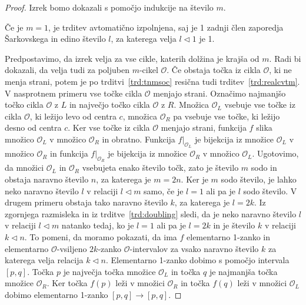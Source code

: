 \documentclass[mat2]{fmfdelo}
\begin{document}
\begin{proof}
Izrek bomo dokazali s pomočjo indukcije na število $m$. 

Če je $m=1$, je trditev avtomatično izpolnjena, saj je 1 zadnji člen zaporedja Šarkovskega in edino število $l$, za katerega velja $l \triangleleft 1$ je 1. 

Predpostavimo, da izrek velja za vse cikle, katerih dolžina je krajša od $m$. Radi bi dokazali, da velja tudi za poljuben $m$-cikel $\mathcal{O}$. Če obstaja točka iz cikla $\mathcal{O}$, ki ne menja strani, potem je po trditvi~\ref{trd:tnmsoc} resična tudi trditev~\ref{trd:realcvtm}. V nasprotnem primeru vse točke cikla $\mathcal{O}$ menjajo strani. Označimo najmanjšo točko cikla $\mathcal{O}$  z $L$ in največjo točko cikla $\mathcal{O}$ z $R$. Množica $\mathcal{O}_L$ vsebuje vse točke iz cikla $\mathcal{O}$, ki ležijo levo od centra $c$, množica $\mathcal{O}_R$ pa vsebuje vse točke, ki ležijo desno od centra $c$. Ker vse točke iz cikla $\mathcal{O}$ menjajo strani, funkcija $f$ slika množico $\mathcal{O}_L$ v množico $\mathcal{O}_R$ in obratno. Funkcija $f|_{\mathcal{O}_L}$ je bijekcija iz množice $\mathcal{O}_L$ v množico $\mathcal{O}_R$ in funkcija $f|_{\mathcal{O}_R}$ je bijekcija iz množice $\mathcal{O}_R$ v množico $\mathcal{O}_L$. Ugotovimo, da množici $\mathcal{O}_L$ in $\mathcal{O}_R$ vsebujeta enako število točk, zato je število $m$ sodo in obstaja naravno število $n$, za katerega je $m = 2 n$. Ker je $m$ sodo število, je lahko neko naravno število $l$ v relaciji $l \triangleleft m$ samo, če je $l=1$ ali pa je $l$ sodo število. V drugem primeru obstaja tako naravno število $k$, za katerega je $l = 2 k$. Iz zgornjega razmisleka in iz trditve~\ref{trd:doubling} sledi, da je neko naravno število $l$ v relaciji $l \triangleleft m$ natanko tedaj, ko je $l=1$ ali pa je $l=2k$ in je število $k$ v relaciji $k \triangleleft n$. To pomeni, da moramo pokazati, da ima $f$ elementarno 1-zanko in elementarno $\mathcal{O}$-vsiljeno $2k$-zanko $\mathcal{O}$-intervalov za vsako naravno število $k$ za katerega velja relacija $k \triangleleft n$. Elementarno 1-zanko dobimo s pomočjo intervala $[p, q]$. Točka $p$ je največja točka množice $\mathcal{O}_L$ in točka $q$ je najmanjša točka množice $\mathcal{O}_R$. Ker točka $f(p)$ leži v množici $\mathcal{O}_R$ in točka $f(q)$ leži v množici $\mathcal{O}_L$ dobimo elementarno 1-zanko $[p, q] \to [p, q]$.

\end{proof}
\end{document}
